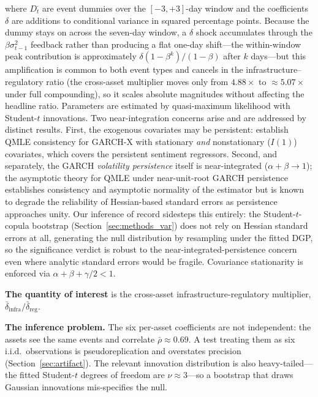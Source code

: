 \documentclass[pdflatex,sn-mathphys-num]{sn-jnl}
\theoremstyle{thmstyleone}
\theoremstyle{thmstyletwo}
\theoremstyle{thmstylethree}
\begin{document}
where $D^{\cdot}_t$ are event dummies over the $[-3,+3]$-day window and the coefficients $\delta$ are additions to conditional variance in squared percentage points. Because the dummy stays on across the seven-day window, a $\delta$ shock accumulates through the $\beta\sigma^2_{t-1}$ feedback rather than producing a flat one-day shift---the within-window peak contribution is approximately $\delta(1-\beta^{k})/(1-\beta)$ after $k$ days---but this amplification is common to both event types and cancels in the infrastructure--regulatory ratio (the cross-asset multiplier moves only from $4.88\times$ to $\approx 5.07\times$ under full compounding), so it scales absolute magnitudes without affecting the headline ratio. Parameters are estimated by quasi-maximum likelihood with Student-$t$ innovations. Two near-integration concerns arise and are addressed by distinct results. First, the exogenous covariates may be persistent: \citet{HanKristensen2014} establish QMLE consistency for GARCH-X with stationary \emph{and} nonstationary ($I(1)$) covariates, which covers the persistent sentiment regressors. Second, and separately, the GARCH \emph{volatility persistence} itself is near-integrated ($\alpha+\beta\to 1$); the asymptotic theory for QMLE under near-unit-root GARCH persistence \citep{Nelson1990, Lumsdaine1996} establishes consistency and asymptotic normality of the estimator but is known to degrade the reliability of Hessian-based standard errors as persistence approaches unity. Our inference of record sidesteps this entirely: the Student-$t$-copula bootstrap (Section~\ref{sec:methods_var}) does not rely on Hessian standard errors at all, generating the null distribution by resampling under the fitted DGP, so the significance verdict is robust to the near-integrated-persistence concern even where analytic standard errors would be fragile. Covariance stationarity is enforced via $\alpha+\beta+\gamma/2<1$.

\textbf{The quantity of interest} is the cross-asset infrastructure-regulatory multiplier, $\bar\delta_{\text{infra}}/\bar\delta_{\text{reg}}$.

\textbf{The inference problem.} The six per-asset coefficients are not independent: the assets see the same events and correlate $\bar\rho \approx 0.69$. A test treating them as six i.i.d.\ observations is pseudoreplication and overstates precision (Section~\ref{sec:artifact}). The relevant innovation distribution is also heavy-tailed---the fitted Student-$t$ degrees of freedom are $\nu \approx 3$---so a bootstrap that draws Gaussian innovations mis-specifies the null.
\end{document}
